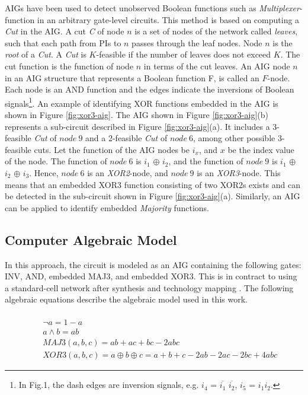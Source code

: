 AIGs have been used to detect unobserved Boolean functions such as \textit{Multiplexer}-function \cite{cunxiyu:dac16} in an arbitrary gate-level circuits. This method is based on computing a \textit{Cut} in the AIG. A cut \textit{C} of node $n$ is a set of nodes of the network called \textit{leaves}, such that each path from PIs to $n$ passes through the leaf nodes. Node $n$ is the \textit{root} of a \textit{Cut}. A \textit{Cut} is $K$-feasible if the number of leaves does not exceed $K$. The cut function is the function of node $n$ in terms of the cut leaves. An AIG node $n$ in an AIG structure that represents a Boolean function F, is called an $F$-node. Each node is an AND function and the edges indicate the inversions of Boolean signals\footnote{In Fig.1, the dash edges are inversion signals, e.g. $i_4$ = $\overline{i_1}$  $\overline{i_2}$, $i_5$ = $i_1$$i_2$.}. 
%
An example of identifying XOR functions embedded in the AIG is shown in Figure \ref{fig:xor3-aig}. The AIG shown in Figure \ref{fig:xor3-aig}(b) represents a sub-circuit described in Figure \ref{fig:xor3-aig}(a). It includes a 3-feasible \textit{Cut} of $node~9$ and a 2-feasible \textit{Cut} of $node~6$, among other possible 3-feasible cuts. Let the function of the AIG nodes be $i_{x}$, and $x$ be the index value of the node. 
The function of $node~6$ is $i_1$ $\oplus$ $i_2$, and the function of $node~9$ is $i_1$ $\oplus$ $i_2$ $\oplus$ $i_3$. Hence, $node~6$ is an \textit{XOR2}-node, and $node~9$ is an \textit{XOR3}-node. This means that an embedded XOR3 function consisting of two XOR2s exists and can be detected in the sub-circuit shown in Figure \ref{fig:xor3-aig}(a). Similarly, an AIG can be applied to identify embedded \textit{Majority} functions.


\subsection{Computer Algebraic Model}

In this approach, the circuit is modeled as an AIG containing the following gates: INV, AND, embedded MAJ3, and embedded XOR3. This is in contract to using a standard-cell network after synthesis and technology mapping \cite{ciesielski2015verification}. The following algebraic equations describe the algebraic model used in this work.

{\scriptsize
\vspace{-4mm}
\begin{equation}
     \begin{aligned}
      \text{~~} &\\
       & \neg a = 1 - a \\
       & a \wedge b = ab \\
       & MAJ3(a, b, c) = ab+ac+bc - 2abc \\
       & XOR3(a, b, c) = a \oplus b \oplus c  = a + b + c - 2ab - 2ac - 2bc + 4abc
     \end{aligned}
\label{eq:boolean-poly}
\end{equation}
}

